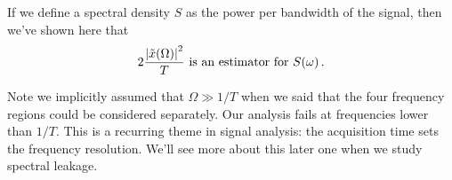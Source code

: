 \documentclass{article}
\begin{document}
If we define a spectral density $S$ as the power per bandwidth of the signal, then we've shown here that
\begin{equation}
2 \frac{\left \lvert \tilde{x}(\Omega) \right \rvert^2}{T} \text{ is an estimator for } S(\omega) \, .
\end{equation}

Note we implicitly assumed that $\Omega \gg 1/T$ when we said that the four frequency regions could be considered separately.
Our analysis fails at frequencies lower than $1/T$.
This is a recurring theme in signal analysis: the acquisition time sets the frequency resolution.
We'll see more about this later one when we study spectral leakage.
\end{document}
